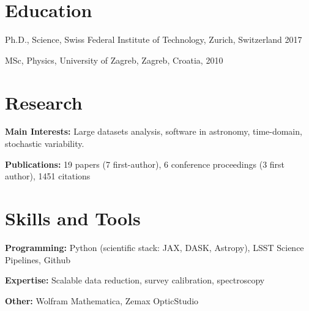 \documentclass[11pt,letterpaper]{article}
\renewenvironment{itemize}{
  \begin{list}{}{
    \setlength{\leftmargin}{1.5em}
    \setlength{\itemsep}{0.10em}
    \setlength{\parskip}{0pt}
    \setlength{\parsep}{0.10em}
  }
}{
  \end{list}
}
\begin{document}
\section*{Education}
\begin{itemize}
  \item Ph.D., Science, Swiss Federal Institute of Technology, Zurich, Switzerland 2017 \par
  \item MSc, Physics, University of Zagreb, Zagreb, Croatia, 2010 \par

\end{itemize}

\section*{Research}
\textbf{Main Interests:} Large datasets analysis, software in astronomy, time-domain, stochastic variability. \par
\textbf{Publications:} 19 papers (7 first-author), 6 conference proceedings  (3 first author), 1451 citations


\section*{Skills and Tools}
\begin{itemize}
\item \textbf{Programming:} Python (scientific stack: JAX, DASK, Astropy), LSST Science Pipelines,  Github
\item \textbf{Expertise:} Scalable data reduction, survey calibration, spectroscopy
    \item \textbf{Other:} Wolfram Mathematica, Zemax OpticStudio
\end{itemize}

\end{document}
